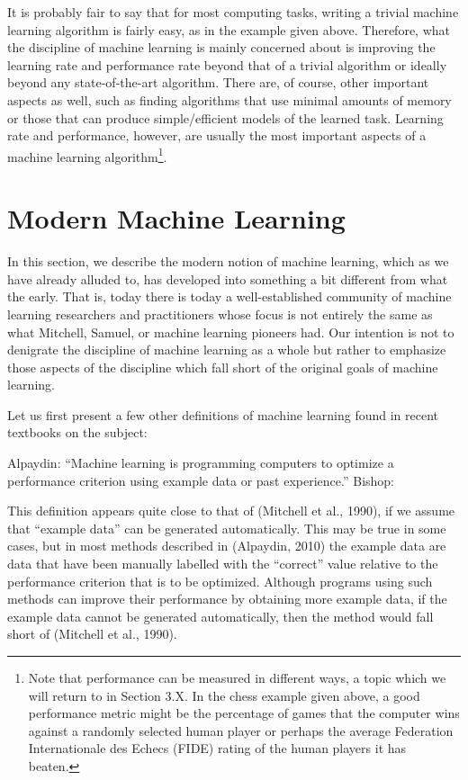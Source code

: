 It is probably fair to say that for most computing tasks, writing a trivial machine learning algorithm is fairly easy, as in the example given above. Therefore, what the discipline of machine learning is mainly concerned about is improving the learning rate and performance rate beyond that of a trivial algorithm or ideally beyond any state-of-the-art algorithm. There are, of course, other important aspects as well, such as finding algorithms that use minimal amounts of memory or those that can produce simple/efficient models of the learned task. Learning rate and performance, however, are usually the most important aspects of a machine learning algorithm\footnote{Note that performance can be measured in different ways, a topic which we will return to in Section 3.X. In the chess example given above, a good performance metric might be the percentage of games that the computer wins against a randomly selected human player or perhaps the average Federation Internationale des Echecs (FIDE) rating of the human players it has beaten.}.

\section{Modern Machine Learning}
\label{sec:machine-learning-learning}

In this section, we describe the modern notion of machine learning, which as we have already alluded to, has developed into something a bit different from what the early. That is, today there is today a well-established community of machine learning researchers and practitioners whose focus is not entirely the same as what Mitchell, Samuel, or machine learning pioneers had. Our intention is not to denigrate the discipline of machine learning as a whole but rather to emphasize those aspects of the discipline which fall short of the original goals of machine learning. 

Let us first present a few other definitions of machine learning found in recent textbooks on the subject:

Alpaydin: ``Machine learning is programming computers to optimize a performance criterion using example data or past experience.''
Bishop: 


This definition appears quite close to that of (Mitchell et al., 1990), if we assume that ``example data'' can be generated automatically. This may be true in some cases, but in most methods described in (Alpaydin, 2010) the example data are data that have been manually labelled with the ``correct'' value relative to the performance criterion that is to be optimized. Although programs using such methods can improve their performance by obtaining more example data, if the example data cannot be generated automatically, then the method would fall short of (Mitchell et al., 1990).

